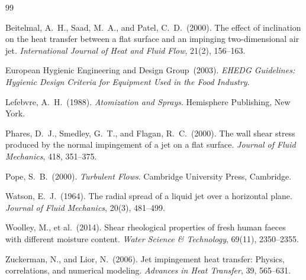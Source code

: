 \documentclass[aps,prfluids,reprint,amsmath,amssymb,floatfix]{revtex4-2}
\begin{document}


\begin{thebibliography}{99}

Beitelmal, A.~H., Saad, M.~A., and Patel, C.~D.\ (2000).
The effect of inclination on the heat transfer between a flat surface
and an impinging two-dimensional air jet.
\textit{International Journal of Heat and Fluid Flow}, 21(2), 156--163.

European Hygienic Engineering and Design Group\ (2003).
\textit{EHEDG Guidelines: Hygienic Design Criteria for Equipment Used
in the Food Industry}.

Lefebvre, A.~H.\ (1988).
\textit{Atomization and Sprays}.
Hemisphere Publishing, New York.

Phares, D.~J., Smedley, G.~T., and Flagan, R.~C.\ (2000).
The wall shear stress produced by the normal impingement of a jet
on a flat surface.
\textit{Journal of Fluid Mechanics}, 418, 351--375.

Pope, S.~B.\ (2000).
\textit{Turbulent Flows}.
Cambridge University Press, Cambridge.

Watson, E.~J.\ (1964).
The radial spread of a liquid jet over a horizontal plane.
\textit{Journal of Fluid Mechanics}, 20(3), 481--499.

Woolley, M., et al.\ (2014).
Shear rheological properties of fresh human faeces with different
moisture content.
\textit{Water Science \& Technology}, 69(11), 2350--2355.

Zuckerman, N., and Lior, N.\ (2006).
Jet impingement heat transfer: Physics, correlations, and numerical
modeling.
\textit{Advances in Heat Transfer}, 39, 565--631.

\end{thebibliography}
\end{document}
